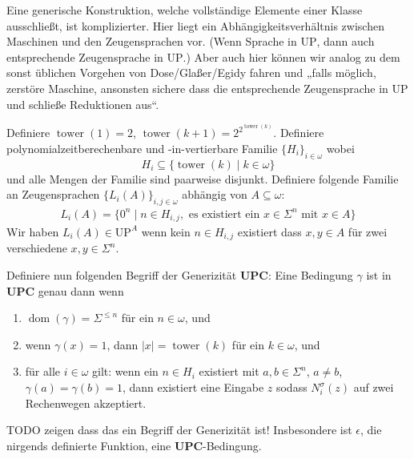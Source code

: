 \documentclass[nofonts]{uebung}
\newtheorem{definition}[theorem]{Definition}
\def\UP{\ensuremath{\mathrm{UP}}}
\def\DisjNP{\ensuremath{\mathrm{DisjNP}}}
\DeclareMathOperator{\dom}{dom}
\DeclareMathOperator{\tower}{tower}
\begin{document}
Eine generische Konstruktion, welche vollständige Elemente einer Klasse ausschließt, ist komplizierter. Hier liegt ein Abhängigkeitsverhältnis zwischen Maschinen und den Zeugensprachen vor. (Wenn Sprache in $\UP$, dann auch entsprechende Zeugensprache in $\UP$.)
Aber auch hier können wir analog zu dem sonst üblichen Vorgehen von Dose/Glaßer/Egidy fahren und „falls möglich, zerstöre Maschine, ansonsten sichere dass die entsprechende Zeugensprache in $\UP$ und schließe Reduktionen aus“.



Definiere $\tower(1)=2$, $\tower(k+1)=2^{2^{\tower(k)}}$.
Definiere polynomialzeitberechenbare und -in-\linebreak{}vertierbare Familie $\{H_{i}\}_{i\in\omega}$ wobei
\[ H_{i} \subseteq \{ \tower(k) \mid k\in\omega \} \]
und alle Mengen der Familie sind paarweise disjunkt.
Definiere folgende Familie an Zeugensprachen $\{L_{i}(A) \}_{i,j\in\omega}$ abhängig von $A\subseteq\omega$:
\begin{gather*}
    L_{i}(A) = \{ 0^n \mid n\in H_{i,j}, \text{ es existiert ein $x\in\Sigma^n$ mit $x\in A$} \}
\end{gather*}
Wir haben $L_{i}(A)\in\UP^A$ wenn kein $n\in H_{i,j}$ existiert dass $x, y\in A$ für zwei verschiedene $x,y\in\Sigma^n$.


Definiere nun folgenden Begriff der Generizität $\mathbf{UPC}$: Eine Bedingung $\gamma$ ist in $\mathbf{UPC}$
genau dann wenn 
\begin{enumerate}
    \item $\dom(\gamma)=\Sigma^{\leq n}$ für ein $n\in\omega$, und
    \item wenn $\gamma(x)=1$, dann $|x|= \tower(k)$ für ein $k\in\omega$, und
    \item für alle $i\in\omega$ gilt: wenn ein $n\in H_i$ existiert mit $a,b\in\Sigma^n$, $a\neq b$, $\gamma(a)=\gamma(b)=1$, dann existiert eine Eingabe $z$ sodass $N_i^\sigma(z)$ auf zwei Rechenwegen akzeptiert.
\end{enumerate}
TODO zeigen dass das ein Begriff der Generizität ist!
Insbesondere ist $\epsilon$, die nirgends definierte Funktion, eine $\mathbf{UPC}$-Bedingung.
\end{document}
